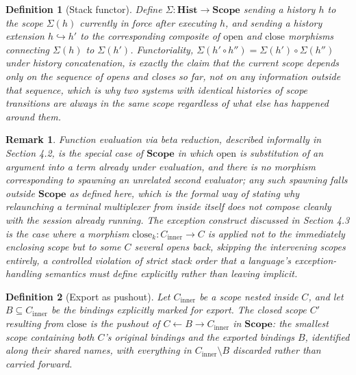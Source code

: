 \documentclass[11pt]{article}
\newtheorem{definition}{Definition}
\newtheorem{remark}{Remark}
\begin{document}
\begin{definition}[Stack functor]
Define $\Sigma : \mathbf{Hist} \to \mathbf{Scope}$ sending a history $h$ to the scope $\Sigma(h)$ currently in force after executing $h$, and sending a history extension $h \hookrightarrow h'$ to the corresponding composite of $\mathrm{open}$ and $\mathrm{close}$ morphisms connecting $\Sigma(h)$ to $\Sigma(h')$. Functoriality, $\Sigma(h' \circ h'') = \Sigma(h') \circ \Sigma(h'')$ under history concatenation, is exactly the claim that the current scope depends only on the sequence of opens and closes so far, not on any information outside that sequence, which is why two systems with identical histories of scope transitions are always in the same scope regardless of what else has happened around them.
\end{definition}

\begin{remark}
Function evaluation via beta reduction, described informally in Section 4.2, is the special case of $\mathbf{Scope}$ in which $\mathrm{open}$ is substitution of an argument into a term already under evaluation, and there is no morphism corresponding to spawning an unrelated second evaluator; any such spawning falls outside $\mathbf{Scope}$ as defined here, which is the formal way of stating why relaunching a terminal multiplexer from inside itself does not compose cleanly with the session already running. The exception construct discussed in Section 4.3 is the case where a morphism $\mathrm{close}_k : C_{\mathrm{inner}} \to C$ is applied not to the immediately enclosing scope but to some $C$ several opens back, skipping the intervening scopes entirely, a controlled violation of strict stack order that a language's exception-handling semantics must define explicitly rather than leaving implicit.
\end{remark}

\begin{definition}[Export as pushout]
Let $C_{\mathrm{inner}}$ be a scope nested inside $C$, and let $B \subseteq C_{\mathrm{inner}}$ be the bindings explicitly marked for export. The closed scope $C'$ resulting from $\mathrm{close}$ is the pushout of $C \leftarrow B \rightarrow C_{\mathrm{inner}}$ in $\mathbf{Scope}$: the smallest scope containing both $C$'s original bindings and the exported bindings $B$, identified along their shared names, with everything in $C_{\mathrm{inner}} \setminus B$ discarded rather than carried forward.
\end{definition}
\end{document}
